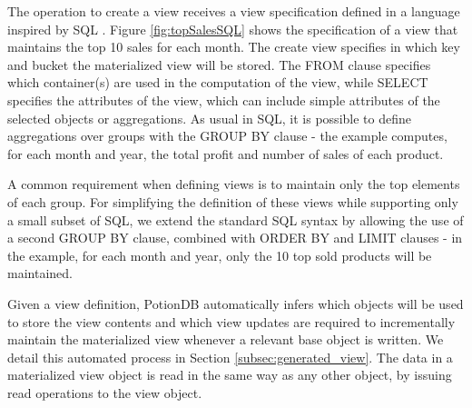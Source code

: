 \documentclass[sigconf, nonacm]{acmart}
\newcommand{\qcr}[1]{{\fontfamily{qcr}\selectfont #1}}
\begin{document}
The operation to create a view receives a view specification defined in a language inspired by SQL \cite{sequel}.
Figure \ref{fig:topSalesSQL} shows the specification of a view that maintains the top 10 sales for
each month. %
The create view specifies in which key and bucket the materialized view will be stored.
The \qcr{FROM} clause specifies which container(s) are used in the computation of the view, while \qcr{SELECT} specifies
the attributes of the view, which can include simple attributes of the selected objects or aggregations.
As usual in SQL, it is possible to define aggregations over groups with the \qcr{GROUP BY} clause - the example 
computes, for each month and year, the total profit and number of sales of each product.

A common requirement when defining views \cite{tpch} is to maintain only the top elements
of each group.  For simplifying the definition of these views while supporting only a small subset of SQL,
we extend the standard SQL syntax by allowing the use of a second  \qcr{GROUP BY} clause, combined
with  \qcr{ORDER BY} and  \qcr{LIMIT} clauses - in the example, for each month and year, only the 10 
top sold products will be maintained.

Given a view definition, PotionDB automatically infers which objects will be used to store the view contents and
which view updates are required to incrementally maintain the materialized view whenever a relevant base object 
is written. We detail this automated process in Section \ref{subsec:generated_view}.
The data in a materialized view object is read in the same way as any other object, by issuing read
operations to the view object.
\end{document}
